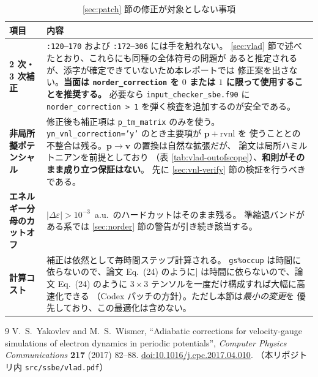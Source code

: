 \documentclass[dvipdfmx,a4paper,11pt]{jsarticle}
\newcommand{\file}[1]{\texttt{#1}}
\newcommand{\vp}{\bm{p}}
\newcommand{\vv}{\bm{v}}
\newcommand{\eps}{\varepsilon}
\begin{document}
\begin{table}[htbp]
\centering
\caption{\ref{sec:patch} 節の修正が対象としない事項}
\label{tab:patch-scope}
\begin{tabular}{@{}p{38mm}p{107mm}@{}}
\toprule
\textbf{項目} & \textbf{内容} \\
\midrule
\textbf{2 次・3 次補正} &
\file{:120--170} および \file{:172--306} には手を触れない。
\ref{sec:vlad} 節で述べたとおり、これらにも同種の全体符号の問題が
あると推定されるが、添字が確定できていないため本レポートでは
修正案を出さない。\textbf{当面は \file{norder\_correction} を
$0$ または $1$ に限って使用することを推奨する。}
必要なら \file{input\_checker\_sbe.f90} に
\file{norder\_correction > 1} を弾く検査を追加するのが安全である。 \\[2mm]

\textbf{非局所擬ポテンシャル} &
修正後も補正項は \file{p\_tm\_matrix} のみを使う。
\file{yn\_vnl\_correction='y'} のとき主要項が $\vp+\mathrm{rvnl}$ を
使うこととの不整合は残る。$\vp\to\vv$ の置換は自然な拡張だが、
論文は局所ハミルトニアンを前提としており
（表 \ref{tab:vlad-outofscope}）、\textbf{和則がそのまま成り立つ保証はない}。
先に \ref{sec:vnl-verify} 節の検証を行うべきである。 \\[2mm]

\textbf{エネルギー分母の\newline カットオフ} &
$|\Delta\eps| > 10^{-3}$~a.u.\ のハードカットはそのまま残る。
準縮退バンドがある系では \ref{sec:norder} 節の警告が引き続き該当する。 \\[2mm]

\textbf{計算コスト} &
補正は依然として毎時間ステップ計算される。
\verb|gs%occup| は時間に依らないので、論文 Eq.~(24) のように
$3\times3$ テンソルを一度だけ構成すれば大幅に高速化できる
（Codex パッチの方針）。ただし本節は\emph{最小の変更}を
優先しており、この最適化は含めない。 \\
\bottomrule
\end{tabular}
\end{table}

\begin{thebibliography}{9}
V.~S.~Yakovlev and M.~S.~Wismer,
``Adiabatic corrections for velocity-gauge simulations of electron dynamics
in periodic potentials'',
\emph{Computer Physics Communications} \textbf{217} (2017) 82--88.
\href{https://doi.org/10.1016/j.cpc.2017.04.010}{doi:10.1016/j.cpc.2017.04.010}.
（本リポジトリ内 \file{src/ssbe/vlad.pdf}）
\end{thebibliography}
\end{document}

